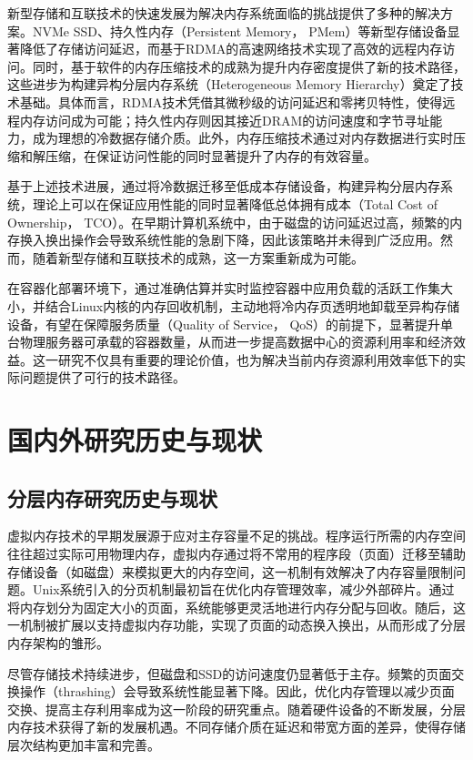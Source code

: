 新型存储和互联技术的快速发展为解决内存系统面临的挑战提供了多种的解决方案。NVMe SSD、持久性内存（Persistent Memory， PMem）等新型存储设备显著降低了存储访问延迟，而基于RDMA的高速网络技术实现了高效的远程内存访问。同时，基于软件的内存压缩技术的成熟为提升内存密度提供了新的技术路径，这些进步为构建异构分层内存系统（Heterogeneous Memory Hierarchy）奠定了技术基础。具体而言，RDMA技术凭借其微秒级的访问延迟和零拷贝特性，使得远程内存访问成为可能；持久性内存则因其接近DRAM的访问速度和字节寻址能力，成为理想的冷数据存储介质。此外，内存压缩技术通过对内存数据进行实时压缩和解压缩，在保证访问性能的同时显著提升了内存的有效容量。

基于上述技术进展，通过将冷数据迁移至低成本存储设备，构建异构分层内存系统，理论上可以在保证应用性能的同时显著降低总体拥有成本（Total Cost of Ownership， TCO）。在早期计算机系统中，由于磁盘的访问延迟过高，频繁的内存换入换出操作会导致系统性能的急剧下降，因此该策略并未得到广泛应用。然而，随着新型存储和互联技术的成熟，这一方案重新成为可能。

在容器化部署环境下，通过准确估算并实时监控容器中应用负载的活跃工作集大小，并结合Linux内核的内存回收机制，主动地将冷内存页透明地卸载至异构存储设备，有望在保障服务质量（Quality of Service， QoS）的前提下，显著提升单台物理服务器可承载的容器数量，从而进一步提高数据中心的资源利用率和经济效益。这一研究不仅具有重要的理论价值，也为解决当前内存资源利用效率低下的实际问题提供了可行的技术路径。

\section{国内外研究历史与现状}

\subsection{分层内存研究历史与现状}

虚拟内存技术的早期发展源于应对主存容量不足的挑战。程序运行所需的内存空间往往超过实际可用物理内存，虚拟内存通过将不常用的程序段（页面）迁移至辅助存储设备（如磁盘）来模拟更大的内存空间，这一机制有效解决了内存容量限制问题。Unix系统引入的分页机制最初旨在优化内存管理效率，减少外部碎片。通过将内存划分为固定大小的页面，系统能够更灵活地进行内存分配与回收。随后，这一机制被扩展以支持虚拟内存功能，实现了页面的动态换入换出，从而形成了分层内存架构的雏形。

尽管存储技术持续进步，但磁盘和SSD的访问速度仍显著低于主存。频繁的页面交换操作（thrashing）会导致系统性能显著下降。因此，优化内存管理以减少页面交换、提高主存利用率成为这一阶段的研究重点。随着硬件设备的不断发展，分层内存技术获得了新的发展机遇。不同存储介质在延迟和带宽方面的差异，使得存储层次结构更加丰富和完善。

